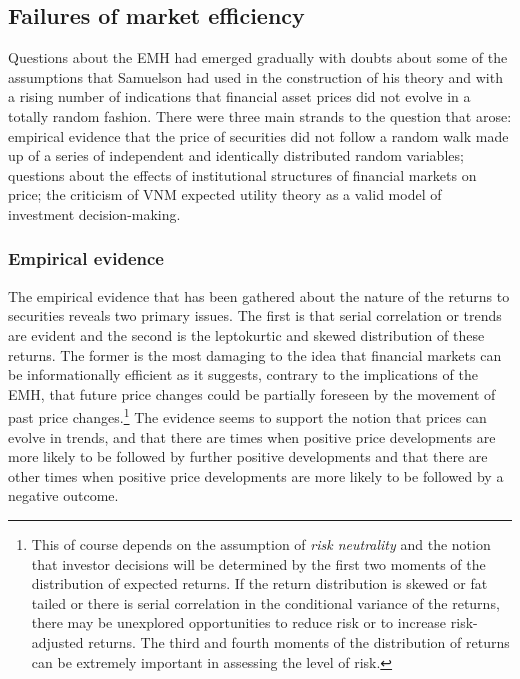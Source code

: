 \documentclass[12pt, a4paper, oneside]{article} %
\begin{document}

\subsection{Failures of market efficiency}
Questions about the EMH had emerged gradually with doubts about some of the assumptions that Samuelson had used in the construction of his theory and with a rising number of indications that financial asset prices did not evolve in a totally random fashion.  There were three main strands to the question that arose:   empirical evidence that the price of securities did not follow a random walk made up of a series of independent and identically distributed random variables;  questions about the effects of institutional structures of financial markets on price;  the criticism of VNM expected utility theory as a valid model of investment decision-making. 

\subsubsection{Empirical evidence}
The empirical evidence that has been gathered about the nature of the returns to securities reveals two primary issues.  The first is that serial correlation or trends are evident and the second is the leptokurtic and skewed distribution of these returns.  The former is the most damaging to the idea that financial markets can be informationally efficient as it suggests, contrary to the implications of the EMH, that future price changes could be partially foreseen by the movement of past price changes.\footnote{This of course depends on the assumption of \emph{risk neutrality} and the notion that investor decisions will be determined by the first two moments of the distribution of expected returns.  If the return distribution is skewed or fat tailed or there is serial correlation in the conditional variance of the returns, there may be unexplored opportunities to reduce risk or to increase risk-adjusted returns. The third and fourth moments of the distribution of returns can be extremely important in assessing the level of risk.}  The evidence seems to support the notion that prices can evolve in trends, and that there are times when positive price developments are more likely to be followed by further positive developments and that there are other times when positive price developments are more likely to be followed by a negative outcome.    
\end{document}
